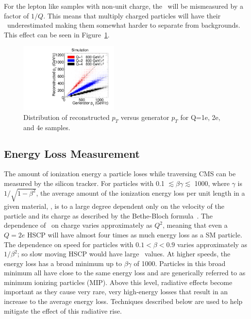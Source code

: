 For the lepton like samples with non-unit charge, the \pt\ will be mismeasured by a factor of $1/Q$. This means that multiply 
charged particles will have their \pt\ underestimated making them somewhat harder to separate from backgrounds.
This effect can be seen in Figure~\ref{fig:RecoGenPt}.

\begin{figure}
 \begin{center}
  \includegraphics[width=0.44\textwidth]{figures/tkonly/SIM_Validation_Pt.pdf}
 \end{center}
 \caption{Distribution of reconstructed $p_T$ versus generator $p_T$ for Q=1e, 2e, and 4e samples.
    \label{fig:RecoGenPt}}
\end{figure}

\subsection{Energy Loss Measurement \label{sec:DedxMeasurement}}
The amount of ionization energy a particle loses while traversing CMS can be measured by the silicon tracker.
For particles with 0.1 $\lesssim \beta \gamma \lesssim$ 1000, where $\gamma$ is $1/\sqrt{1 - \beta^2}$,
the average amount of the ionization energy loss per unit length in a given material, \dedx, is to a large degree dependent only on the velocity of the particle
and its charge as described by the Bethe-Bloch formula~\cite{PDG}.
The dependence of \dedx\  on charge varies approximately as $Q^2$, meaning that even a $Q=2e$ HSCP will have almost four times as much energy loss as a SM particle. 
The dependence on speed for particles with $0.1 < \beta < 0.9$ varies approximately as $1/\beta^2$; so slow moving HSCP would have large \dedx\ values.
At higher speeds, the energy loss has a broad minimum up to $\beta \gamma$ of 1000.
Particles in this broad minimum all have close to the same energy loss and are generically referred to as minimum ionizing particles (MIP).
Above this level, radiative effects become important as they cause very rare, very high-energy losses that result in an increase to the average energy loss.
Techniques described below are used to help mitigate the effect of this radiative rise.

